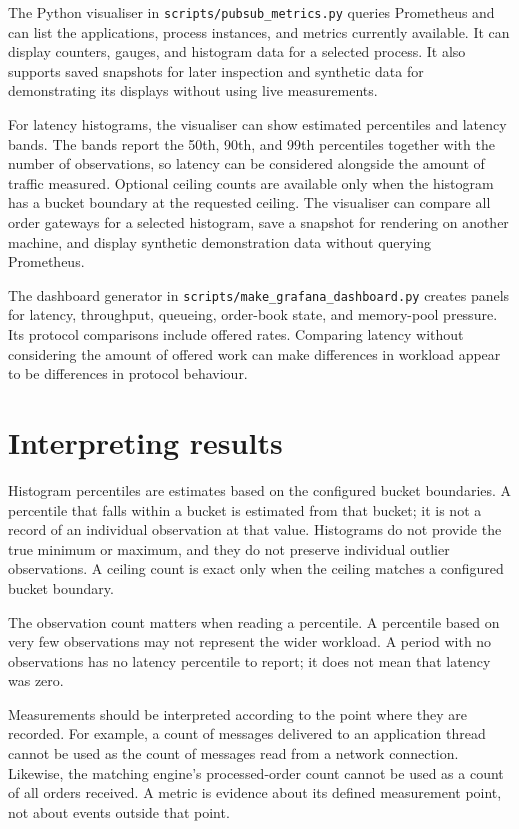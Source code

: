 The Python visualiser in \texttt{scripts/pubsub\_metrics.py} queries Prometheus and can
list the applications, process instances, and metrics currently available. It can display
counters, gauges, and histogram data for a selected process. It also supports saved
snapshots for later inspection and synthetic data for demonstrating its displays without
using live measurements.

For latency histograms, the visualiser can show estimated percentiles and latency bands.
The bands report the 50th, 90th, and 99th percentiles together with the number of
observations, so latency can be considered alongside the amount of traffic measured.
Optional ceiling counts are available only when the histogram has a bucket boundary at
the requested ceiling. The visualiser can compare all order gateways for a selected
histogram, save a snapshot for rendering on another machine, and display synthetic
demonstration data without querying Prometheus.

The dashboard generator in \texttt{scripts/make\_grafana\_dashboard.py} creates panels
for latency, throughput, queueing, order-book state, and memory-pool pressure. Its
protocol comparisons include offered rates. Comparing latency without considering the
amount of offered work can make differences in workload appear to be differences in
protocol behaviour.

\section{Interpreting results}

Histogram percentiles are estimates based on the configured bucket boundaries. A
percentile that falls within a bucket is estimated from that bucket; it is not a record
of an individual observation at that value. Histograms do not provide the true minimum or
maximum, and they do not preserve individual outlier observations. A ceiling count is
exact only when the ceiling matches a configured bucket boundary.

The observation count matters when reading a percentile. A percentile based on very few
observations may not represent the wider workload. A period with no observations has no
latency percentile to report; it does not mean that latency was zero.

Measurements should be interpreted according to the point where they are recorded. For
example, a count of messages delivered to an application thread cannot be used as the
count of messages read from a network connection. Likewise, the matching engine's
processed-order count cannot be used as a count of all orders received. A metric is
evidence about its defined measurement point, not about events outside that point.
